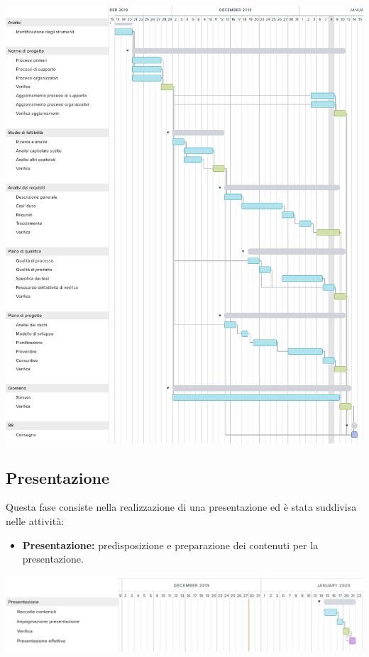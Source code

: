 \includegraphics[width=\textwidth]{res/img/g1113}

\subsection{Presentazione}
Questa fase consiste nella realizzazione di una presentazione ed è stata suddivisa nelle attività:
\begin{itemize}
	\item \textbf{Presentazione:} predisposizione e preparazione dei contenuti per la presentazione.
\end{itemize}
\includegraphics[width=\textwidth]{res/img/g2}

